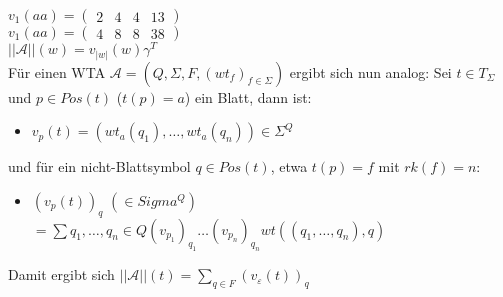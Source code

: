 \documentclass[titlepage]{article}
\begin{document}
$v_1 (aa) = \begin{pmatrix}2 & 4 & 4 & 13\end{pmatrix}$\\
$v_1 (aa) = \begin{pmatrix}4 & 8 & 8 & 38\end{pmatrix}$\\
$||\mathcal{A}||(w) = v_{|w|}(w) \gamma^T$\\

F\"ur einen WTA $\mathcal{A} = (Q, \Sigma, F, (wt_f)_{f \in \Sigma})$
ergibt sich nun analog:
Sei $t \in T_\Sigma$ und $p \in Pos(t)$ ($t(p) = a$) ein Blatt, dann ist:
\begin{itemize}
    \item $v_p(t) = (wt_a(q_1),\dots, wt_a(q_n))\in \Sigma^Q$
\end{itemize}
und f\"ur ein nicht-Blattsymbol $q \in Pos(t)$, etwa $t(p) = f$ mit $rk(f) = n$:
\begin{itemize}
    \item $(v_p(t))_q $ $(\in Sigma^Q)$ $ = \sum\limits{q_1, \dots, q_n \in Q} (v_{p_1})_{q_1} \dots (v_{p_n})_{q_n} wt((q_1, \dots, q_n),q)$
\end{itemize}

Damit ergibt sich $||\mathcal{A}||(t) = \sum\limits_{q \in F}(v_\varepsilon(t))_q$
\end{document}
